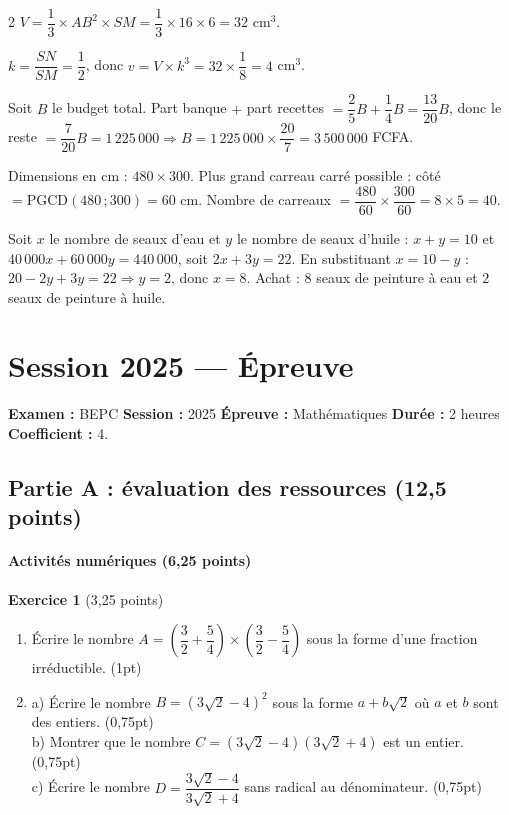 \begin{multicols}{2}
$V=\dfrac13\times AB^{2}\times SM=\dfrac13\times16\times6=32$ cm$^{3}$.

$k=\dfrac{SN}{SM}=\dfrac12$, donc $v=V\times k^{3}=32\times\dfrac18=4$ cm$^{3}$.

Soit $B$ le budget total. Part banque $+$ part recettes $=\dfrac25B+\dfrac14B=\dfrac{13}{20}B$,
donc le reste $=\dfrac{7}{20}B=1\,225\,000\Rightarrow B=1\,225\,000\times\dfrac{20}7=3\,500\,000$
FCFA.

Dimensions en cm : $480\times300$. Plus grand carreau carré possible : côté
$=\text{PGCD}(480\,;300)=60$ cm. Nombre de carreaux $=\dfrac{480}{60}\times\dfrac{300}{60}=8\times5=40$.

Soit $x$ le nombre de seaux d'eau et $y$ le nombre de seaux d'huile : $x+y=10$ et
$40\,000x+60\,000y=440\,000$, soit $2x+3y=22$. En substituant $x=10-y$ :
$20-2y+3y=22\Rightarrow y=2$, donc $x=8$. Achat : $8$ seaux de peinture à eau et $2$ seaux
de peinture à huile.

\end{multicols}

\section{Session 2025 — Épreuve}

\noindent\textbf{Examen :} BEPC \quad\textbf{Session :} 2025 \quad\textbf{Épreuve :}
Mathématiques \quad\textbf{Durée :} 2 heures \quad\textbf{Coefficient :} 4.

\subsection*{Partie A : évaluation des ressources (12,5 points)}

\paragraph{Activités numériques (6,25 points)}

\textbf{Exercice 1} (3,25 points)
\begin{enumerate}[label=\arabic*)]
\item Écrire le nombre $A=\left(\dfrac32+\dfrac54\right)\times\left(\dfrac32-\dfrac54\right)$
sous la forme d'une fraction irréductible. \hfill (1pt)
\item[2)] a) Écrire le nombre $B=(3\sqrt2-4)^{2}$ sous la forme $a+b\sqrt2$ où $a$ et $b$
sont des entiers. \hfill (0,75pt) \\
b) Montrer que le nombre $C=(3\sqrt2-4)(3\sqrt2+4)$ est un entier. \hfill (0,75pt) \\
c) Écrire le nombre $D=\dfrac{3\sqrt2-4}{3\sqrt2+4}$ sans radical au dénominateur. \hfill
(0,75pt)
\end{enumerate}

